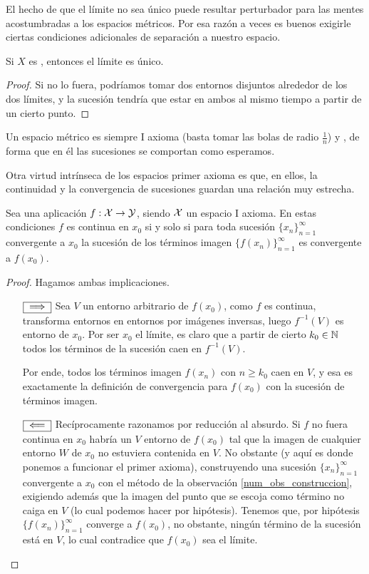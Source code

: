 El hecho de que el límite no sea único puede resultar perturbador para las mentes acostumbradas a los espacios métricos. Por esa razón a veces es buenos exigirle ciertas condiciones adicionales de separación a nuestro espacio.
\begin{prop}
	Si $X$ es \hausdorff, entonces el límite es único.
\end{prop}
\begin{proof}
	Si no lo fuera, podríamos tomar dos entornos disjuntos alrededor de los dos límites, y la sucesión tendría que estar en ambos al mismo tiempo a partir de un cierto punto.
\end{proof}

\begin{obs}
	Un espacio métrico es siempre I axioma (basta tomar las bolas de radio $\frac{1}{n}$) y \hausdorff, de forma que en él las sucesiones se comportan como esperamos.
\end{obs}
Otra virtud intrínseca de los espacios primer axioma es que, en ellos, la continuidad y la convergencia de sucesiones guardan una relación muy estrecha.
\begin{prop}
	Sea una aplicación $f:\mathcal{X}\to\mathcal{Y}$, siendo $\mathcal{X}$ un espacio I axioma. En estas condiciones $f$ es continua en $x_0$ si y solo si para toda sucesión $\{x_n\}_{n=1}^\infty$ convergente a $x_0$ la sucesión de los términos imagen $\{f(x_n)\}_{n=1}^\infty$ es convergente a $f(x_0)$.
\end{prop}
\begin{proof}
	Hagamos ambas implicaciones.
	\begin{enumerate}
		\item[$\fbox{$\implies$}$] Sea $V$ un entorno arbitrario de $f(x_0)$, como $f$ es continua, transforma entornos en entornos por imágenes inversas, luego $f^{-1}(V)$ es entorno de $x_0$. Por ser $x_0$ el límite, es claro que a partir de cierto $k_0\in\mathbb{N}$ todos los términos de la sucesión caen en $f^{-1}(V)$.
		
		Por ende, todos los términos imagen  $f(x_n)$ con $n\geq k_0$ caen en $V$, y esa es exactamente la definición de convergencia para $f(x_0)$ con la sucesión de términos imagen.
		\item[$\fbox{$\impliedby$}$] Recíprocamente razonamos por reducción al absurdo. Si $f$ no fuera continua en $x_0 $ habría un $V$ entorno de $f(x_0)$ tal que la imagen de cualquier entorno $W$ de $x_0$ no estuviera contenida en $V$. No obstante (y aquí es donde ponemos a funcionar el primer axioma), construyendo una sucesión $\{x_n\}_{n=1}^\infty$ convergente a $x_0$ con el método de la observación \ref{num_obs_construccion}, exigiendo además que la imagen del punto que se escoja como término no caiga en $V$ (lo cual podemos hacer por hipótesis). Tenemos que, por hipótesis $\{f(x_n)\}_{n=1}^{\infty}$ converge a $f(x_0)$, no obstante, ningún término de la sucesión está en $V$, lo cual contradice que $f(x_0)$ sea el límite.\qedhere
	\end{enumerate}
\end{proof}
